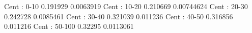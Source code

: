 Cent : 0-10
0.191929 0.0063919
Cent : 10-20
0.210669 0.00744624
Cent : 20-30
0.242728 0.0085461
Cent : 30-40
0.321039 0.011236
Cent : 40-50
0.316856 0.011216
Cent : 50-100
0.32295 0.0113061
